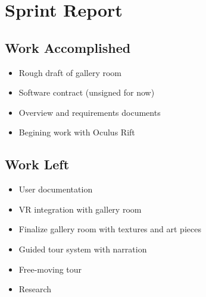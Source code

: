\section*{Sprint Report}
\hrulefill
\subsection*{Work Accomplished}
\begin{itemize}
\item Rough draft of gallery room
\item Software contract (unsigned for now)
\item Overview and requirements documents
\item Begining work with Oculus Rift
\end{itemize}
\subsection*{Work Left}
\begin{itemize}
\item User documentation
\item VR integration with gallery room
\item Finalize gallery room with textures and art pieces
\item Guided tour system with narration
\item Free-moving tour
\item Research
\end{itemize}


